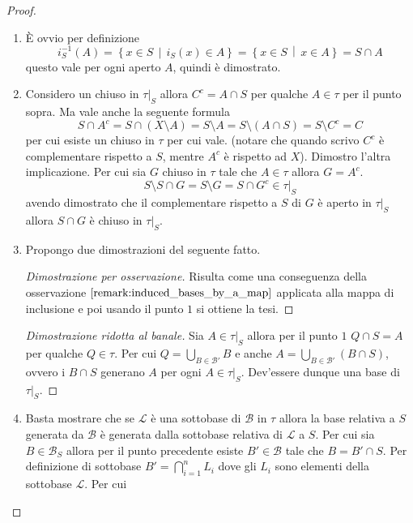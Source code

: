 \begin{proof}
\begin{enumerate}
	\item
		È ovvio per definizione
		\begin{equation*}
			i^{-1}_S(A) = \left\{x \in S \,\middle|\, i_S(x) \in A \right\} = \left\{x \in S \,\middle|\, x \in A\right\} = S \cap A
		\end{equation*}
		questo vale per ogni aperto $A$, quindi è dimostrato.
	\item 
		Considero un chiuso in $\tau|_S$ allora $C^c = A \cap S$ per qualche $A \in \tau$ per il punto sopra. Ma vale anche la seguente formula
		\begin{equation*}
			S \cap A^c = S \cap (X \setminus A) = S \setminus A = S \setminus (A \cap S) = S \setminus C^c = C 
		\end{equation*}
		per cui esiste un chiuso in $\tau$ per cui vale. (notare che quando scrivo $C^c$ è complementare rispetto a $S$, mentre $A^c$ è rispetto ad $X$).
		Dimostro l'altra implicazione. Per cui sia $G$ chiuso in $\tau$ tale che $A \in \tau$ allora $G = A^c$.
		\begin{equation*}
			S \setminus S \cap G = S \setminus G = S \cap G^c \in \tau|_S 
		\end{equation*}  
		avendo dimostrato che il complementare rispetto a $S$ di $G$ è aperto in $\tau|_S$ allora $S \cap G$ è chiuso in $\tau|_S$. 
	\item Propongo due dimostrazioni del seguente fatto.
	\begin{proof}[Dimostrazione per osservazione]
		Risulta come una conseguenza della osservazione $\ref{remark:induced_bases_by_a_map}$ applicata alla mappa di inclusione e poi usando il punto $1$ si ottiene la tesi.
	\end{proof}
	\begin{proof}[Dimostrazione ridotta al banale]
		Sia $A \in \tau|_S$ allora per il punto $1$ $Q \cap S = A$ per qualche $Q \in \tau$. Per cui $Q = \bigcup_{B \in \mathcal{B}'} B$ e anche $A = \bigcup_{B \in \mathcal{B}'} (B \cap S)$, ovvero i $B \cap S$ generano $A$ per ogni $A \in \tau|_S$. Dev'essere dunque una base di $\tau|_S$. 
	\end{proof}
	\item 
		Basta mostrare che se $\mathcal{L}$ è una sottobase di $\mathcal{B}$ in $\tau$ allora la base relativa a $S$ generata da $\mathcal{B}$ è generata dalla sottobase relativa di $\mathcal{L}$ a $S$. Per cui sia $B \in \mathcal{B}_S$ allora per il punto precedente esiste $B' \in \mathcal{B}$ tale che $B = B' \cap S$. Per definizione di sottobase $B' = \bigcap^{n}_{i =1}L_i$ dove gli $L_i$ sono elementi della sottobase $\mathcal{L}$. Per cui

\end{enumerate}
\end{proof}
